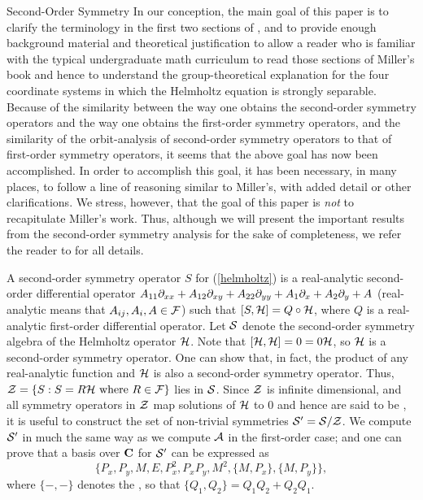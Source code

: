 \begin{section}{Second-Order Symmetry}
In our conception, the main goal of this paper is to clarify the terminology in the first two sections of \cite{miller}, and to provide enough background material and theoretical justification to allow a reader who is familiar with the typical undergraduate math curriculum to read those sections of Miller's book and hence to understand the group-theoretical explanation for the four coordinate systems in which the Helmholtz equation is strongly separable.  Because of  the similarity between the way one obtains the second-order symmetry operators and the way one obtains the first-order symmetry operators, and  the similarity of the orbit-analysis of second-order symmetry operators to that of first-order symmetry operators, it seems that the above goal has now been accomplished.  In order to accomplish this goal, it has been necessary, in many places, to follow a line of reasoning similar to Miller's, with added detail or other clarifications.  We stress, however, that the goal of this paper is \emph{not} to recapitulate Miller's work.  Thus, although we will present the important results from the second-order symmetry analysis for the sake of completeness, we refer the reader to \cite[pp.~17-22]{miller} for all details.

A second-order symmetry operator $S$ for (\ref{helmholtz}) is a real-analytic second-order differential operator $A_{11} \partial_{x x} + A_{12} \partial_{x y} + A_{22} \partial_{y y} + A_1 \partial_{x} + A_2 \partial_{y} + A$ (real-analytic means that $A_{ij}, A_i, A \in \mathcal{F}$) such that $[S,\mathcal{H}] = Q \circ \mathcal{H}$, where $Q$ is a real-analytic first-order differential operator.  Let $\mathcal{S}$ denote the second-order symmetry algebra of the Helmholtz operator $\mathcal{H}$.  Note that $[\mathcal{H},\mathcal{H}] = 0 = 0 \mathcal{H}$, so $\mathcal{H}$ is a second-order symmetry operator.  One can show that, in fact, the product of any real-analytic function and $\mathcal{H}$ is also a second-order symmetry operator.  Thus, $\mathcal{Z} = \{ S: S = R \mathcal{H} \mbox{ where } R \in \mathcal{F} \}$ lies in $\mathcal{S}$.  Since  $\mathcal{Z}$ is infinite dimensional, and  all symmetry operators in $\mathcal{Z}$ map solutions of $\mathcal{H}$ to $0$ and hence are said to be , it is useful to construct the set of non-trivial symmetries $\mathcal{S}^\prime = \mathcal{S} / \mathcal{Z}$.  We compute $\mathcal{S}^\prime$ in much the same way as we compute $\mathcal{A}$ in the first-order case; and one can prove that a basis over $\mathbf{C}$ for $\mathcal{S}^\prime$ can be expressed as
\[
\bigg\{ P_x, P_y, M, E, P_x^2, P_xP_y, M^2, \{ M,P_x \}, \{ M,P_y \} \bigg\},
\]
where $\{ - , - \}$ denotes the , so that $\{ Q_1,Q_2 \} = Q_1Q_2 + Q_2Q_1$.


\end{section}
